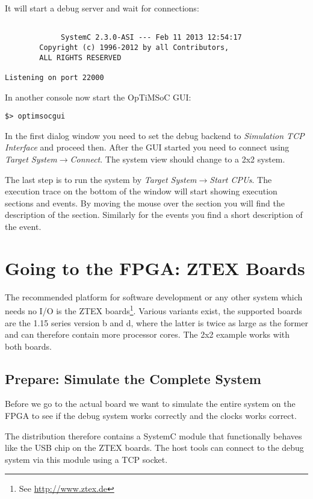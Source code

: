 It will start a debug server and wait for connections:

\begin{lstlisting}

             SystemC 2.3.0-ASI --- Feb 11 2013 12:54:17
        Copyright (c) 1996-2012 by all Contributors,
        ALL RIGHTS RESERVED

Listening on port 22000
\end{lstlisting}

In another console now start the OpTiMSoC GUI:

\begin{lstlisting}
$> optimsocgui
\end{lstlisting}

In the first dialog window you need to set the debug backend to
\emph{Simulation TCP Interface} and proceed then. After the GUI
started you need to connect using \emph{Target
  System}$\rightarrow$\emph{Connect}. The system view should change to
a 2x2 system.

The last step is to run the system by \emph{Target
  System}$\rightarrow$\emph{Start CPUs}. The execution trace on the
bottom of the window will start showing execution sections and events.
By moving the mouse over the section you will find the description of
the section. Similarly for the events you find a short description of
the event.

\section{Going to the FPGA: ZTEX Boards}

The recommended platform for software development or any other system
which needs no I/O is the ZTEX boards\footnote{See
  \url{http://www.ztex.de}}. Various variants exist, the supported boards
are the 1.15 series version b and d, where the latter is twice as
large as the former and can therefore contain more processor cores.
The 2x2 example works with both boards.

\subsection{Prepare: Simulate the Complete System}
\label{subsection:2x2_ztex_simulate_complete_system}

Before we go to the actual board we want to simulate the entire system
on the FPGA to see if the debug system works correctly and the
clocks works correct.

The distribution therefore contains a SystemC module that functionally
behaves like the USB chip on the ZTEX boards. The host tools can
connect to the debug system via this module using a TCP socket.

